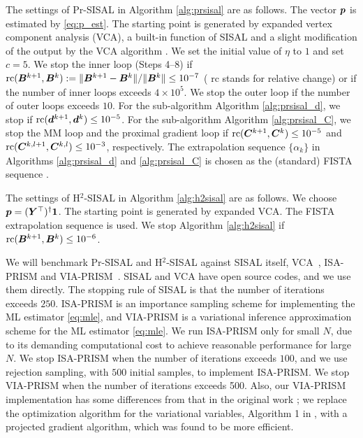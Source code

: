 \documentclass[10pt,twocolumn,twoside]{IEEEtran}
\begin{document}
The settings of Pr-SISAL in Algorithm \ref{alg:prsisal} are as follows.
The vector ${\bm p}$ is estimated by \eqref{eq:p_est}.
The starting point is generated by expanded vertex component analysis (VCA), a built-in function of SISAL and a slight modification of the output by the VCA algorithm \cite{Nascimento2005}.
We set the initial value of $\eta$ to $1$ and set $c= 5$.
We stop the inner loop (Steps 4--8) if ${\rm rc}({\bm B}^{k+1},{\bm B}^k):= \| {\bm B}^{k+1} - {\bm B}^{k} \|/\| {\bm B}^k \| \leq  10^{-7}$ ( rc stands for relative change) or if the number of inner loops  exceeds  $4 \times 10^{5}$.
We stop the outer loop if the number of outer loops exceeds $10$.
For the sub-algorithm Algorithm \ref{alg:prsisal_d}, we stop  if ${\rm rc}({\bm d}^{k+1},{\bm d}^k) \leq 10^{-5}$.
For the sub-algorithm Algorithm \ref{alg:prsisal_C}, we stop the MM loop and the proximal gradient loop if ${\rm rc}({\bm C}^{k+1},{\bm C}^k) \leq 10^{-5}$ and ${\rm rc}({\bm C}^{k,l+1},{\bm C}^{k,l}) \leq 10^{-3}$, respectively.
The extrapolation sequence $\{ \alpha_k \}$ in Algorithms \ref{alg:prsisal_d} and \ref{alg:prsisal_C} is chosen as the (standard) FISTA sequence \cite{beck2017first}.

The settings of H$^2$-SISAL in Algorithm \ref{alg:h2sisal} are as follows.
We choose ${\bm p}= ({\bm Y}^\top)^\dag {\bm 1}$.
The starting point is generated by expanded VCA.
The FISTA extrapolation sequence is used.
We stop Algorithm \ref{alg:h2sisal} if ${\rm rc}({\bm B}^{k+1},{\bm B}^k) \leq 10^{-6}$.

We will benchmark Pr-SISAL and H$^2$-SISAL against SISAL itself, VCA~\cite{Nascimento2005}, ISA-PRISM and VIA-PRISM~\cite{PRISM2021}.
SISAL and VCA have open source codes, and we use them directly.
The stopping rule of SISAL is that the number of iterations exceeds $250$.
ISA-PRISM is an importance sampling scheme for implementing the ML estimator \eqref{eq:mle}, and VIA-PRISM is a variational inference approximation scheme for the ML estimator \eqref{eq:mle}.
We run ISA-PRISM only for small $N$, due to its demanding computational cost to achieve reasonable performance for large $N$.
We stop ISA-PRISM when the number of iterations exceeds $100$, and we use rejection sampling, with $500$ initial samples, to implement ISA-PRISM.
We stop VIA-PRISM when the number of iterations exceeds 500.
Also, our VIA-PRISM implementation has some differences from that in the original work \cite{PRISM2021};
we replace the optimization algorithm for the variational variables, Algorithm 1 in \cite{PRISM2021}, with a projected gradient algorithm, which was found to be more efficient.
\end{document}
